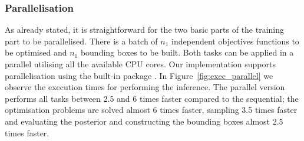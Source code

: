\subsubsection*{Parallelisation}

As already stated, it is straightforward for the two basic parts of
the training part to be parallelised. There is a batch of \(n_1\)
independent objectives functions to be optimised and \(n_1\) bounding
boxes to be built. Both tasks can be applied in a parallel utilising
all the available CPU cores. Our implementation supports
parallelisation using the built-in  package
. In Figure~\ref{fig:exec_parallel} we observe the
execution times for performing the inference. The parallel version
performs all tasks between 2.5 and 6 times faster compared to the
sequential; the optimisation problems are solved almost 6 times
faster, sampling 3.5 times faster and evaluating the posterior and
constructing the bounding boxes almost 2.5 times faster.

